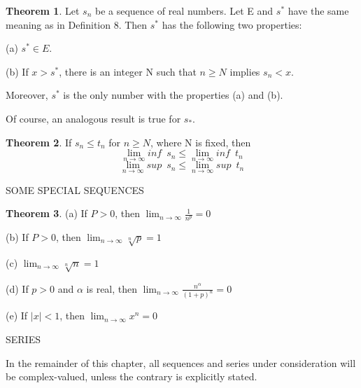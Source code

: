 \documentclass{article}
\theoremstyle{definition}
\newtheorem{theo}{Theorem}
\theoremstyle{remark}
\begin{document}
\begin{theo}
Let ${s_n}$ be a sequence of real numbers. Let E and $s^*$ have the same meaning as in Definition 8. Then $s^*$ has the following two properties:

(a) $s^*\in E$.

(b) If $x>s^*$, there is an integer N such that $n\ge N$ implies $s_n<x$.

Moreover, $s^*$ is the only number with the properties (a) and (b).

Of course, an analogous result is true for $s_*$.
	
\end{theo}

\begin{theo}
	If $s_n\le t_n$ for $n\ge N$, where N is fixed, then
	\[
	\lim_{n\rightarrow\infty} inf\enspace s_n\le \lim_{n\rightarrow\infty} inf\enspace t_n
	\]
	\[
	\lim_{n\rightarrow\infty} sup\enspace s_n\le \lim_{n\rightarrow\infty} sup\enspace t_n
	\]
	
	
\end{theo}

\newpage

SOME SPECIAL SEQUENCES

\begin{theo}
\hspace{\fill}

	(a) If $P>0$, then $\lim_{n\rightarrow\infty}\frac{1}{n^p}=0$

	(b) If $P>0$, then $\lim_{n\rightarrow\infty}\sqrt[n]{p}=1$
	
	(c) $\lim_{n\rightarrow\infty}\sqrt[n]{n}=1$
	
	(d) If $p>0$ and $\alpha$ is real, then $\lim_{n\rightarrow\infty}\frac{n^\alpha}{(1+p)^n}=0$
	
	(e) If $|x|<1$, then $\lim_{n\rightarrow\infty}x^n=0$

\end{theo}

\newpage

SERIES

In the remainder of this chapter, all sequences and series under consideration will be complex-valued, unless the contrary is explicitly stated.
\end{document}
